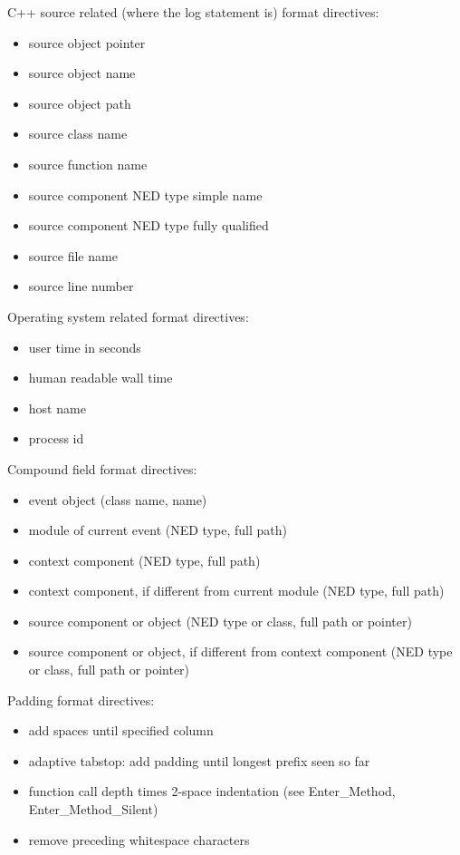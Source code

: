 C++ source related (where the log statement is) format directives:
\begin{itemize}
  \item {} source object pointer
  \item {} source object name
  \item {} source object path
  \item {} source class name
  \item {} source function name
  \item {} source component NED type simple name
  \item {} source component NED type fully qualified
  \item {} source file name
  \item {} source line number
\end{itemize}

Operating system related format directives:
\begin{itemize}
  \item {} user time in seconds
  \item {} human readable wall time
  \item {} host name
  \item {} process id
\end{itemize}

Compound field format directives:
\begin{itemize}
  \item {} event object (class name, name)
  \item {} module of current event (NED type, full path)
  \item {} context component (NED type, full path)
  \item {} context component, if different from current module (NED type, full path)
  \item {} source component or object (NED type or class, full path or pointer)
  \item {} source component or object, if different from context component (NED type or class, full path or pointer)
\end{itemize}

Padding format directives:
\begin{itemize}
  \item \ttt{\%[0-9]+} add spaces until specified column
  \item \ttt{\%|} adaptive tabstop: add padding until longest prefix seen so far
  \item \ttt{\%>} function call depth times 2-space indentation (see Enter\_Method, Enter\_Method\_Silent)
  \item \ttt{\%<} remove preceding whitespace characters
\end{itemize}

